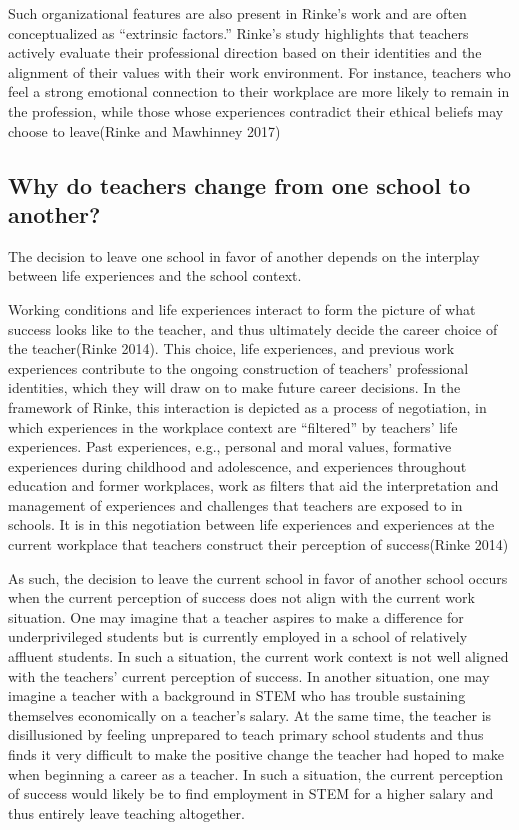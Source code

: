 \documentclass[
]{article}
\begin{document}
Such organizational features are also present in Rinke's work and are often conceptualized as ``extrinsic factors.'' Rinke's study highlights that teachers actively evaluate their professional direction based on their identities and the alignment of their values with their work environment. For instance, teachers who feel a strong emotional connection to their workplace are more likely to remain in the profession, while those whose experiences contradict their ethical beliefs may choose to leave(Rinke and Mawhinney 2017)

\hypertarget{why-do-teachers-change-from-one-school-to-another}{%
\subsection{Why do teachers change from one school to another?}\label{why-do-teachers-change-from-one-school-to-another}}

The decision to leave one school in favor of another depends on the interplay between life experiences and the school context.

Working conditions and life experiences interact to form the picture of what success looks like to the teacher, and thus ultimately decide the career choice of the teacher(Rinke 2014). This choice, life experiences, and previous work experiences contribute to the ongoing construction of teachers' professional identities, which they will draw on to make future career decisions. In the framework of Rinke, this interaction is depicted as a process of negotiation, in which experiences in the workplace context are ``filtered'' by teachers' life experiences. Past experiences, e.g., personal and moral values, formative experiences during childhood and adolescence, and experiences throughout education and former workplaces, work as filters that aid the interpretation and management of experiences and challenges that teachers are exposed to in schools. It is in this negotiation between life experiences and experiences at the current workplace that teachers construct their perception of success(Rinke 2014)

As such, the decision to leave the current school in favor of another school occurs when the current perception of success does not align with the current work situation. One may imagine that a teacher aspires to make a difference for underprivileged students but is currently employed in a school of relatively affluent students. In such a situation, the current work context is not well aligned with the teachers' current perception of success.
In another situation, one may imagine a teacher with a background in STEM who has trouble sustaining themselves economically on a teacher's salary. At the same time, the teacher is disillusioned by feeling unprepared to teach primary school students and thus finds it very difficult to make the positive change the teacher had hoped to make when beginning a career as a teacher. In such a situation, the current perception of success would likely be to find employment in STEM for a higher salary and thus entirely leave teaching altogether.
\end{document}
